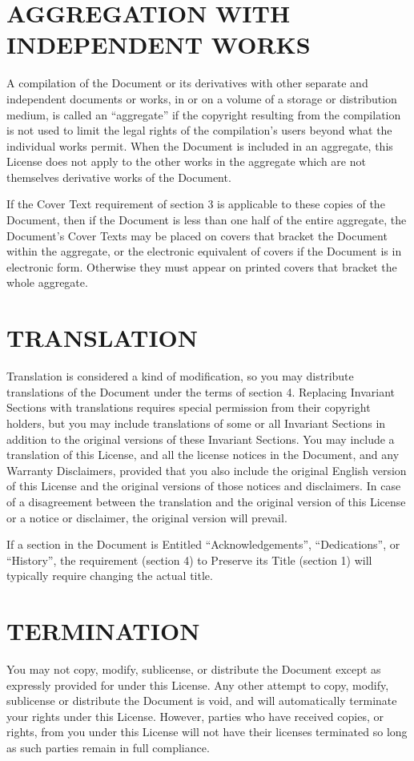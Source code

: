 \section{AGGREGATION WITH INDEPENDENT WORKS}
A compilation of the Document or its derivatives with other separate and independent documents
or works, in or on a volume of a storage or distribution medium, is called an ``aggregate''
if the copyright resulting from the compilation is not used to limit the legal rights of the
compilation’s users beyond what the individual works permit. When the Document is included in
an aggregate, this License does not apply to the other works in the aggregate which are not
themselves derivative works of the Document.

If the Cover Text requirement of section 3 is applicable to these copies of the Document,
then if the Document is less than one half of the entire aggregate, the Document’s Cover Texts
may be placed on covers that bracket the Document within the aggregate, or the electronic
equivalent of covers if the Document is in electronic form. Otherwise they must appear on
printed covers that bracket the whole aggregate.


\section{TRANSLATION}
Translation is considered a kind of modification, so you may distribute translations of the
Document under the terms of section 4. Replacing Invariant Sections with translations requires
special permission from their copyright holders, but you may include translations of some or
all Invariant Sections in addition to the original versions of these Invariant Sections. You
may include a translation of this License, and all the license notices in the Document, and any
Warranty Disclaimers, provided that you also include the original English version of this License
and the original versions of those notices and disclaimers. In case of a disagreement between
the translation and the original version of this License or a notice or disclaimer, the original
version will prevail.

If a section in the Document is Entitled ``Acknowledgements'', ``Dedications'', or ``History'',
the requirement (section 4) to Preserve its Title (section 1) will typically require changing the
actual title.


\section{TERMINATION}
You may not copy, modify, sublicense, or distribute the Document except as expressly provided
for under this License. Any other attempt to copy, modify, sublicense or distribute the Document
is void, and will automatically terminate your rights under this License. However, parties who
have received copies, or rights, from you under this License will not have their licenses terminated
so long as such parties remain in full compliance.


